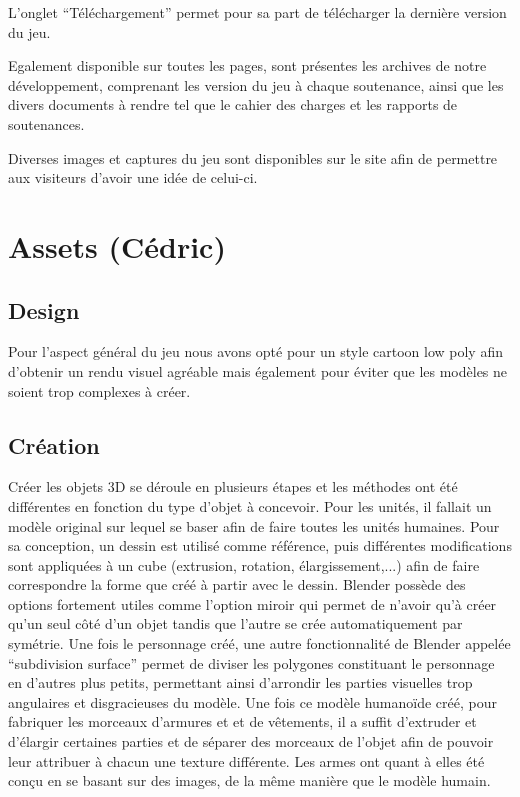 \documentclass[12pt]{report}
\begin{document}
L’onglet “Téléchargement” permet pour sa part de télécharger la dernière version
du jeu.

Egalement disponible sur toutes les pages, sont présentes les archives de notre
développement, comprenant les version du jeu à chaque soutenance, ainsi que les
divers documents à rendre tel que le cahier des charges et les rapports de
soutenances.

Diverses images et captures du jeu sont disponibles sur le site afin de
permettre aux visiteurs d’avoir une idée de celui-ci.

\section{Assets (Cédric)}

\subsection{Design}

Pour l’aspect général du jeu nous avons opté pour un style cartoon low poly afin
d’obtenir un rendu visuel agréable mais également pour éviter que les modèles ne
soient trop complexes à créer.

\subsection{Création}

Créer les objets 3D se déroule en plusieurs étapes et les méthodes ont été
différentes en fonction du type d’objet à concevoir. Pour les unités, il fallait
un modèle original sur lequel se baser afin de faire toutes les unités humaines.
Pour sa conception, un dessin est utilisé comme référence, puis différentes
modifications sont appliquées à un cube (extrusion, rotation, élargissement,...)
afin de faire correspondre la forme que créé à partir avec le dessin. Blender
possède des options fortement utiles comme l’option miroir qui permet de n’avoir
qu’à créer qu’un seul côté d’un objet tandis que l’autre se crée automatiquement
par symétrie. Une fois le personnage créé, une autre fonctionnalité de Blender
appelée “subdivision surface” permet de diviser les polygones constituant le
personnage en d’autres plus petits, permettant ainsi d’arrondir les parties
visuelles trop angulaires et disgracieuses du modèle. Une fois ce modèle
humanoïde créé, pour fabriquer les morceaux d’armures et et de vêtements, il a
suffit d’extruder et d’élargir certaines parties et de séparer des morceaux de
l’objet afin de pouvoir leur attribuer à chacun une texture différente. Les
armes ont quant à elles été conçu en se basant sur des images, de la même
manière que le modèle humain.
\end{document}
